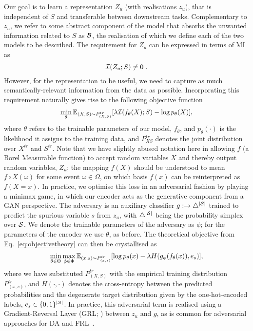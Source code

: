 Our goal is to learn a representation $Z_u$ (with realisations \(z_u\)), that is independent of $S$
and transferable between downstream tasks. 
%
Complementary to $z_u$, we refer to some abstract component of the model that absorbs the unwanted
information related to $S$ as ${\mathcal{B}}$, the realisation of which we define \wrt{} each of the two
models to be described.
The requirement for $Z_u$ can be expressed in terms of \ac{MI} as
%
\begin{align}
  {\mathcal{I}}(Z_u; S) \neq 0~.
  \label{eq:migoal}
\end{align}
%
However, for the representation to be useful, we need to capture as much semantically-relevant
information from the data as possible. 
%
Incorporating this requirement naturally gives rise to the following objective function
%
\begin{align}
  \min_{\theta}
  \mathbb{E}_{(X,S) \sim P^{tr}_{(X, S)}} [
  \lambda {\mathcal{I}}(f_\theta(X);S) -\log p_\theta(X) 
  ],
  \label{eq:objectivetheory}
\end{align}
%
where $\theta$ refers to the trainable parameters of our model, \( f_\theta \), and \(
p_\theta(\cdot) \) is the likelihood it assigns to the training data, and \( P^{tr}_{XS} \) denotes
the joint distribution over \( X^{tr} \) and \( S^{tr} \).
%
Note that we have slightly abused notation here in allowing \(f\) (a Borel Measurable function) to
accept random variables \(X\) and thereby output random variables, \(Z_u\); the mapping \(f(X)\)
should be understood to mean \( f \circ X(\omega) \) for some event \( \omega \in \Omega \), on
which basis \( f(x) \) can be reinterpreted as \( f(X=x) \).
%
In practice, we optimise this loss in an adversarial fashion by playing a minimax game, in which
our encoder acts as the generative component from a \ac{GAN} \citep{goodfellow2014generative}
perspective.
%
The adversary is an auxiliary classifier \(g: \to \bigtriangleup^{|{\mathcal{S}}|} \) trained to predict the
spurious variable \(s\) from \(z_u\), with \(\bigtriangleup^{|{\mathcal{S}}|}\) being the probability simplex
over \({\mathcal{S}}\).
%
We denote the trainable parameters of the adversary as $\phi$; for the parameters of the encoder we
use $\theta$, as before. 
%
The theoretical objective from Eq.~\ref{eq:objectivetheory} can then be crystallised as
%
\begin{align}
  \min_{ \theta \in \Theta} \max_{\phi \in \Phi}
  \mathbb{E}_{(x, s) \sim P^{tr}_{(x,s)}}[
  \log p_\theta(x)
  -\lambda H( g_\phi ( f_\theta(x) ), e_{s})
  ],
  \label{eq:objectivepractical}
\end{align} 
%
where we have substituted \( P^{ tr }_{ (X, S) } \) with the empirical training distribution \( P^{
tr }_{ (x, s) } \), and \( H(\cdot, \cdot) \) denotes the cross-entropy between the predicted
probabilities and the degenerate target distribution given by the one-hot-encoded labels, $e_{s}
\in \{0, 1\}^{|{\mathcal{S}}|}$.
%
In practice, this adversarial term is realised using a Gradient-Reversal Layer (GRL;
\citealp{ganin2016domain}) between \(z_u\) and \(g\), as is common for adversarial approaches for
\acl{DA} and \acl{FRL}~\citep{edwards2016censoring}.
%
